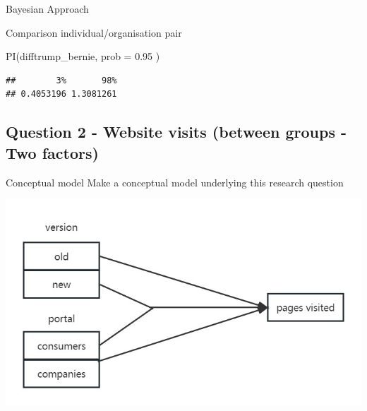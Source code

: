 \documentclass[
  ignorenonframetext,
]{beamer}
\newenvironment{Shaded}{\begin{snugshade}}{\end{snugshade}}
\newcommand{\AttributeTok}[1]{\textcolor[rgb]{0.77,0.63,0.00}{#1}}
\newcommand{\FloatTok}[1]{\textcolor[rgb]{0.00,0.00,0.81}{#1}}
\newcommand{\FunctionTok}[1]{\textcolor[rgb]{0.00,0.00,0.00}{#1}}
\newcommand{\NormalTok}[1]{#1}
\begin{document}
\begin{frame}[fragile]{Bayesian Approach}
\begin{block}{Comparison individual/organisation pair}
\begin{Shaded}
\begin{Highlighting}[]
\FunctionTok{PI}\NormalTok{(difftrump\_bernie, }\AttributeTok{prob =} \FloatTok{0.95}\NormalTok{ )}
\end{Highlighting}
\end{Shaded}

\begin{verbatim}
##        3%       98% 
## 0.4053196 1.3081261
\end{verbatim}
\end{block}
\end{frame}

\hypertarget{question-2---website-visits-between-groups---two-factors}{%
\subsection{Question 2 - Website visits (between groups - Two
factors)}\label{question-2---website-visits-between-groups---two-factors}}

\begin{frame}{Conceptual model}
\protect\hypertarget{conceptual-model-1}{}
Make a conceptual model underlying this research question

\includegraphics{CM.jpg}
\end{frame}
\end{document}
